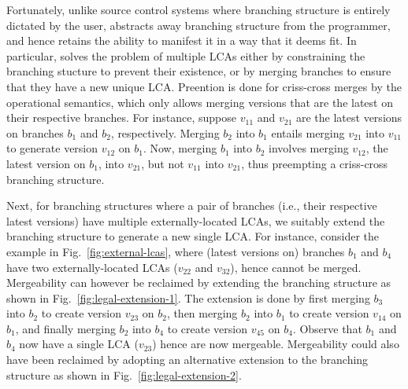 Fortunately, unlike source control systems where branching structure
is entirely dictated by the user, \name abstracts away branching
structure from the programmer, and hence retains the ability to
manifest it in a way that it deems fit. In particular, \name solves
the problem of multiple LCAs either by constraining the branching
stucture to prevent their existence, or by merging branches to ensure
that they have a new unique LCA.  Preention is done for
criss-cross merges by the operational semantics, which only allows
merging versions that are the latest on their respective branches. For
instance, suppose $v_{11}$ and $v_{21}$ are the latest versions on branches
$b_1$ and $b_2$, respectively. Merging $b_2$ into $b_1$ entails
merging $v_{21}$ into $v_{11}$ to generate version $v_{12}$ on $b_1$.
Now, merging $b_1$ into $b_2$ involves merging $v_{12}$, the latest
version on $b_1$, into $v_{21}$, but not $v_{11}$ into $v_{21}$, thus
preempting a criss-cross branching structure.

Next, for branching structures where a pair of branches (i.e., their
respective latest versions) have multiple externally-located LCAs, we
suitably extend the branching structure to generate a new single LCA.
 For instance, consider
the example in Fig.~\ref{fig:external-lcas}, where (latest versions
on) branches $b_1$ and $b_4$ have two externally-located LCAs
($v_{22}$ and $v_{32}$), hence cannot be merged. Mergeability can
however be reclaimed by extending the branching structure as shown in
Fig.~\ref{fig:legal-extension-1}. The extension is done by first
merging $b_3$ into $b_2$ to create version $v_{23}$ on $b_2$, then
merging $b_2$ into $b_1$ to create version $v_{14}$ on $b_1$, and
finally merging $b_2$ into $b_4$ to create version $v_{45}$ on
$b_4$. Observe that $b_1$ and $b_4$ now have a single LCA ($v_{23}$)
hence are now mergeable. Mergeability could also have been reclaimed
by adopting an alternative extension to the branching structure as
shown in Fig.~\ref{fig:legal-extension-2}.

